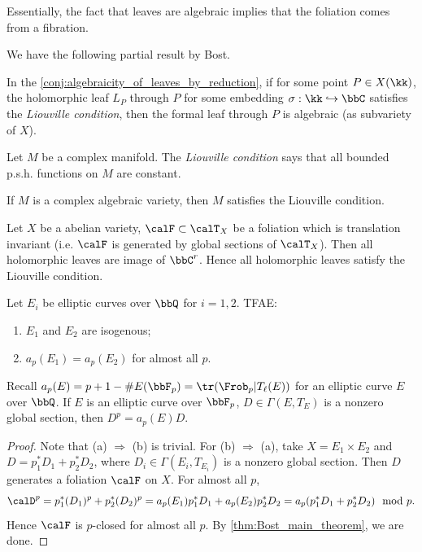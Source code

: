   Essentially, the fact that leaves are algebraic implies that the foliation comes from a fibration.

  We have the following partial result by Bost.

  \begin{theorem}\label{thm:Bost_main_theorem}
    In the \cref{conj:algebraicity_of_leaves_by_reduction}, if for some point $P \in X(\kk)$, the holomorphic leaf $L_P$ through $P$ for some embedding $\sigma: \kk \hookrightarrow \bbC$ satisfies the \emph{Liouville condition}, then the formal leaf through $P$ is algebraic (as subvariety of $X$).
  \end{theorem}

  \begin{definition}
    Let $M$ be a complex manifold.
    The \emph{Liouville condition} says that all bounded p.s.h. functions on $M$ are constant.
  \end{definition}

  \begin{remark}
    If $M$ is a complex algebraic variety, then $M$ satisfies the Liouville condition.
  \end{remark}

  \begin{example}
    Let $X$ be a abelian variety, $\calF \subset \calT_X$ be a foliation which is translation invariant (i.e. $\calF$ is generated by global sections of $\calT_X$).
    Then all holomorphic leaves are image of $\bbC^r$.
    Hence all holomorphic leaves satisfy the Liouville condition.
  \end{example}

  \begin{corollary}\label{cor:isogeny_of_elliptic_curves_by_foliation}
    Let $E_i$ be elliptic curves over $\bbQ$ for $i = 1, 2$.
    TFAE:
    \begin{enumerate}
      \item $E_1$ and $E_2$ are isogenous;
      \item $a_p(E_1) = a_p(E_2)$ for almost all $p$.
    \end{enumerate}
  \end{corollary}
  Recall $a_p(E) = p + 1 - \#E(\bbF_p) = \tr(\Frob_p|T_\ell(E))$ for an elliptic curve $E$ over $\bbQ$.
  If $E$ is an elliptic curve over $\bbF_p$, $D \in \Gamma(E, T_E)$ is a nonzero global section, then $D^p = a_p(E) D$.
  \begin{proof}
    Note that (a) $\Rightarrow$ (b) is trivial.
    For (b) $\Rightarrow$ (a), take $X = E_1 \times E_2$ and $D = p^*_1 D_1 + p^*_2 D_2$, where $D_i \in \Gamma(E_i, T_{E_i})$ is a nonzero global section.
    Then $D$ generates a foliation $\calF$ on $X$.
    For almost all $p$, 
    \[ \calD^p = p^*_1 (D_1)^p + p^*_2 (D_2)^p = a_p(E_1) p^*_1 D_1 + a_p(E_2) p^*_2 D_2 = a_p (p^*_1 D_1 + p^*_2 D_2) \mod p. \]
    Hence $\calF$ is $p$-closed for almost all $p$.
    By \cref{thm:Bost_main_theorem}, we are done.
  \end{proof}

